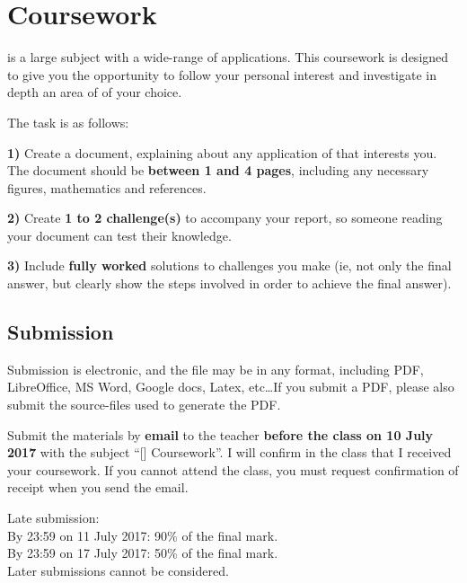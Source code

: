 \newpage
\section{Coursework}
\course is a large subject with a wide-range of applications. This coursework is designed to give you the opportunity to follow your personal interest and investigate in depth an area of \course of your choice.

The task is as follows:

\textbf{1)} Create a document, explaining about any application of \course that interests you. The document should be \textbf{between 1 and 4 pages}, including any necessary figures, mathematics and references.

\textbf{2)} Create \textbf{1 to 2 challenge(s)} to accompany your report, so someone reading your document can test their knowledge.

\textbf{3)} Include \textbf{fully worked} solutions to challenges you make (ie, not only the final answer, but clearly show the steps involved in order to achieve the final answer).

\subsection{Submission}
Submission is electronic, and the file may be in any format, including PDF, LibreOffice, MS Word, Google docs, Latex, etc\ldots If you submit a PDF, please also submit the source-files used to generate the PDF.

Submit the materials by \textbf{email} to the teacher \textbf{before the class on 10 July 2017} with the subject ``[\coursenospace] Coursework''. I will confirm in the class that I received your coursework. If you cannot attend the class, you must request confirmation of receipt when you send the email.

Late submission:\\
By 23:59 on 11 July 2017: 90\% of the final mark.\\
By 23:59 on 17 July 2017: 50\% of the final mark.\\
Later submissions cannot be considered.

